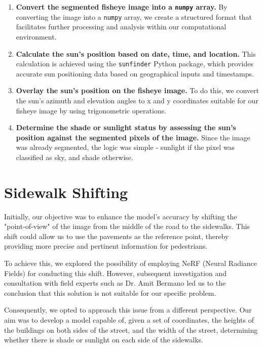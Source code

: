 \documentclass[nohyperref]{article}
\theoremstyle{plain}
\theoremstyle{definition}
\theoremstyle{remark}
\begin{document}
\begin{enumerate}
    \item \textbf{Convert the segmented fisheye image into a \texttt{numpy} array.}
    By converting the image into a \texttt{numpy} array, we create a structured format that facilitates further processing and analysis within our computational environment.

    \item \textbf{Calculate the sun's position based on date, time, and location.}
    This calculation is achieved using the \texttt{sunfinder} Python package, which provides accurate sun positioning data based on geographical inputs and timestamps.

    \item \textbf{Overlay the sun's position on the fisheye image.}
    To do this, we convert the sun's azimuth and elevation angles to x and y coordinates suitable for our fisheye image by using trigonometric operations.
    
    \item \textbf{Determine the shade or sunlight status by assessing the sun's position against the segmented pixels of the image.} Since the image was already segmented, the logic was simple - sunlight if the pixel was classified as sky, and shade otherwise.
\end{enumerate}

\section{Sidewalk Shifting}
\label{sidewalk-shifting-method}
Initially, our objective was to enhance the model's accuracy by shifting the "point-of-view" of the image from the middle of the road to the sidewalks. This shift could allow us to use the pavements as the reference point, thereby providing more precise and pertinent information for pedestrians.

To achieve this, we explored the possibility of employing NeRF (Neural Radiance Fields) for conducting this shift. However, subsequent investigation and consultation with field experts such as Dr. Amit Bermano led us to the conclusion that this solution is not suitable for our specific problem.

Consequently, we opted to approach this issue from a different perspective. Our aim was to develop a model capable of, given a set of coordinates, the heights of the buildings on both sides of the street, and the width of the street, determining whether there is shade or sunlight on each side of the sidewalks.
\end{document}
